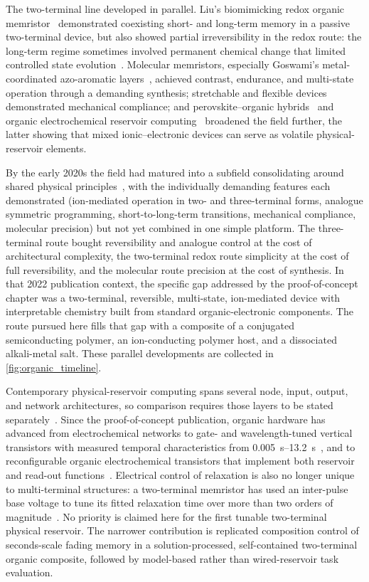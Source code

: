 \documentclass[12pt, twoside]{report}
\begin{document}
The two-terminal line developed in parallel. Liu's biomimicking redox organic memristor~\cite{Liu2016} demonstrated coexisting short- and long-term memory in a passive two-terminal device, but also showed partial irreversibility in the redox route: the long-term regime sometimes involved permanent chemical change that limited controlled state evolution~\cite{Heremans2011}. Molecular memristors, especially Goswami's metal-coordinated azo-aromatic layers~\cite{Goswami2017, Goswami2020}, achieved contrast, endurance, and multi-state operation through a demanding synthesis; stretchable and flexible devices~\cite{Kim2018, Yang2018, Park2020, Kim2018_inorg} demonstrated mechanical compliance; and perovskite--organic hybrids~\cite{Xiao2016, Shih2016} and organic electrochemical reservoir computing~\cite{Cucchi2021} broadened the field further, the latter showing that mixed ionic--electronic devices can serve as volatile physical-reservoir elements.

By the early 2020s the field had matured into a subfield consolidating around shared physical principles~\cite{VanDeBurgt2018, Markovic2020}, with the individually demanding features each demonstrated (ion-mediated operation in two- and three-terminal forms, analogue symmetric programming, short-to-long-term transitions, mechanical compliance, molecular precision) but not yet combined in one simple platform. The three-terminal route bought reversibility and analogue control at the cost of architectural complexity, the two-terminal redox route simplicity at the cost of full reversibility, and the molecular route precision at the cost of synthesis. In that 2022 publication context, the specific gap addressed by the proof-of-concept chapter was a two-terminal, reversible, multi-state, ion-mediated device with interpretable chemistry built from standard organic-electronic components. The route pursued here fills that gap with a composite of a conjugated semiconducting polymer, an ion-conducting polymer host, and a dissociated alkali-metal salt. These parallel developments are collected in \cref{fig:organic_timeline}.

Contemporary physical-reservoir computing spans several node, input, output, and network architectures, so comparison requires those layers to be stated separately~\cite{Liang2024PhysicalRC}. Since the proof-of-concept publication, organic hardware has advanced from electrochemical networks to gate- and wavelength-tuned vertical transistors with measured temporal characteristics from \SIrange{0.005}{13.2}{\second}~\cite{Gao2024GroupedRC}, and to reconfigurable organic electrochemical transistors that implement both reservoir and read-out functions~\cite{Han2025ReconfigurableOECT}. Electrical control of relaxation is also no longer unique to multi-terminal structures: a two-terminal  memristor has used an inter-pulse base voltage to tune its fitted relaxation time over more than two orders of magnitude~\cite{Lee2025TunableRC}. No priority is claimed here for the first tunable two-terminal physical reservoir. The narrower contribution is replicated composition control of seconds-scale fading memory in a solution-processed, self-contained two-terminal organic composite, followed by model-based rather than wired-reservoir task evaluation.
\end{document}
